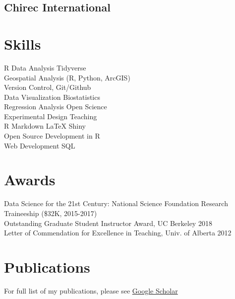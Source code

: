 \documentclass[a4]{deedy-resume-openfont}
\begin{document}
\begin{minipage}[t]{0.32\textwidth}
\subsection{Chirec International}
\sectionsep


\section{Skills}
\textbullet{} R \textbullet{} Data Analysis \textbullet{} Tidyverse \\\textbullet{} Geospatial Analysis (R, Python, ArcGIS) \\\textbullet{} Version Control, Git/Github \\\textbullet{} Data Visualization \textbullet{} Biostatistics \\\textbullet{} Regression Analysis \textbullet{} Open Science \\\textbullet{} Experimental Design \textbullet{} Teaching \\\textbullet{} R Markdown \textbullet{} LaTeX \textbullet{} Shiny \\\textbullet{} Open Source Development in R \\ \textbullet{} Web Development \textbullet{} SQL 
\sectionsep


\section{Awards}

\textbullet{} Data Science for the 21st Century: National Science Foundation Research Traineeship (\$32K, 2015-2017) \\
\textbullet{} Outstanding Graduate Student Instructor Award, UC Berkeley 2018\\
\textbullet{} Letter of Commendation for Excellence in Teaching, Univ. of Alberta 2012\\
\sectionsep

\section{Publications}
For full list of my publications, please see \href{https://scholar.google.com/citations?user=0BKLXCUAAAAJ}{Google Scholar \faGraduationCap} 

%
%

\end{minipage} 
\end{document}
